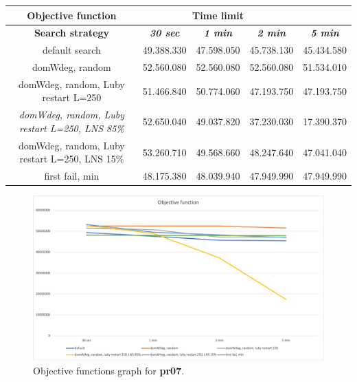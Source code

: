 {
\renewcommand{\arraystretch}{2}
\begin{longtable}[h]{| c | c | c | c | c |}
    \hline
    \textbf{Objective function} & \multicolumn{3}{c}{Time limit} & \\
    \hline
    \textbf{Search strategy} & \textbf{\textit{30 sec}} & \textbf{\textit{1 min}} & \textbf{\textit{2 min}} & \textbf{\textit{5 min}} \\
    \hline
    \endhead
    default search                                         & 49.388.330 & 47.598.050 & 45.738.130 & 45.434.580 \\
    \hline
    domWdeg, random                                        & 52.560.080 & 52.560.080 & 52.560.080 & 51.534.010 \\
    \hline
    domWdeg, random, Luby restart L=250                    & 51.466.840 & 50.774.060 & 47.193.750 & 47.193.750 \\
    \hline
    \textit{domWdeg, random, Luby restart L=250, LNS 85\%} & 52.650.040 & 49.037.820 & 37.230.030 & 17.390.370 \\
    \hline
    domWdeg, random, Luby restart L=250, LNS 15\%          & 53.260.710 & 49.568.660 & 48.247.640 & 47.041.040 \\
    \hline
    first fail, min                                        & 48.175.380 & 48.039.940 & 47.949.990 & 47.949.990 \\
    \hline
\end{longtable}
}
\begin{figure}[H]
    \centering
    \includegraphics[width=0.8\columnwidth]{../graphs/pr07-objf.png}
    \caption{Objective functions graph for \textbf{pr07}.}
\end{figure}

